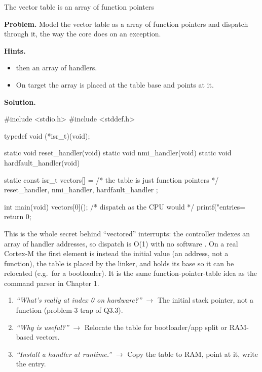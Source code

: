 \begin{gymproblem}{The vector table is an array of function pointers}

\textbf{Problem.} Model the vector table as a  array of function
pointers and dispatch through it, the way the core does on an exception.

\textbf{Hints.}
\begin{itemize}
\item {} then an array of handlers.
\item On target the array is placed at the table base and  points
  at it.
\end{itemize}

\attempt

\textbf{Solution.}
\begin{cgym}
#include <stdio.h>
#include <stddef.h>

typedef void (*isr_t)(void);

static void reset_handler(void)     { }
static void nmi_handler(void)       { }
static void hardfault_handler(void) { }

static const isr_t vectors[] = {        /* the table is just function pointers */
    reset_handler, nmi_handler, hardfault_handler
};

int main(void) {
    vectors[0]();                        /* dispatch as the CPU would */
    printf("entries=%
    return 0;
}
\end{cgym}

This is the whole secret behind ``vectored'' interrupts: the controller indexes
an array of handler addresses, so dispatch is O(1) with no software
. On a real Cortex-M the first element is instead the initial
 value (an address, not a function), the table is placed by the
linker, and  holds its base so it can be relocated (e.g.\ for a
bootloader). It is the same function-pointer-table idea as the command parser
in Chapter 1.

\followups
\begin{enumerate}
\item \emph{``What's really at index 0 on hardware?''} $\rightarrow$ The
  initial stack pointer, not a function (problem-3 trap of Q3.3).
\item \emph{``Why is  useful?''} $\rightarrow$ Relocate the table
  for bootloader/app split or RAM-based vectors.
\item \emph{``Install a handler at runtime.''} $\rightarrow$ Copy the table to
  RAM, point  at it, write the entry.
\end{enumerate}
\end{gymproblem}

